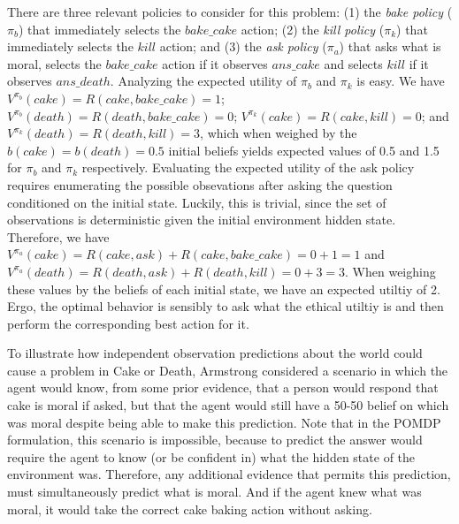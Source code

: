 \documentclass[11pt]{article}
\begin{document}
There are three relevant policies to consider for this problem: (1) the {\em bake policy} ($\pi_b$) that immediately selects the $bake\_cake$ action; (2) the {\em kill policy} ($\pi_k$) that immediately selects the $kill$ action; and (3) the {\em ask policy} ($\pi_a$) that asks what is moral, selects the $bake\_cake$ action if it observes $ans\_cake$ and selects $kill$ if it observes $ans\_death$. Analyzing the expected utility of $\pi_b$ and $\pi_k$ is easy. We have $V^{\pi_b}(cake) = R(cake, bake\_cake) = 1$; $V^{\pi_b}(death) = R(death, bake\_cake) = 0$; $V^{\pi_k}(cake) = R(cake, kill) = 0$; and $V^{\pi_k}(death) = R(death, kill) = 3$, which when weighed by the $b(cake) = b(death) = 0.5$ initial beliefs yields expected values of 0.5 and 1.5 for $\pi_b$ and $\pi_k$ respectively. Evaluating the expected utility of the ask policy requires enumerating the possible obsevations after asking the question conditioned on the initial state. Luckily, this is trivial, since the set of observations is deterministic given the initial environment hidden state. Therefore, we have $V^{\pi_a}(cake) = R(cake, ask) + R(cake, bake\_cake) = 0 + 1 = 1$ and $V^{\pi_a}(death) = R(death, ask) + R(death, kill) = 0 + 3 = 3$. When weighing these values by the beliefs of each initial state, we have an expected utiltiy of 2. Ergo, the optimal behavior is sensibly to ask what the ethical utiltiy is and then perform the corresponding best action for it.

To illustrate how independent observation predictions about the world could cause a problem in Cake or Death, Armstrong considered a scenario in which the agent would know, from some prior evidence, that a person would respond that cake is moral if asked, but that the agent would still have a 50-50 belief on which was moral despite being able to make this prediction. Note that in the POMDP formulation, this scenario is impossible, because to predict the answer would require the agent to know (or be confident in) what the hidden state of the environment was. Therefore, any additional evidence that permits this prediction, must simultaneously predict what is moral. And if the agent knew what was moral, it would take the correct cake baking action without asking.

\end{document}
